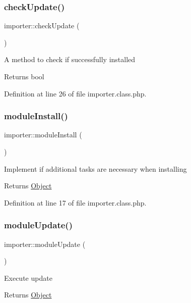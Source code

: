 \subsubsection{\texorpdfstring{check\+Update()}{checkUpdate()}}
{\footnotesize\ttfamily importer\+::check\+Update (\begin{DoxyParamCaption}{ }\end{DoxyParamCaption})}

A method to check if successfully installed \begin{DoxyReturn}{Returns}
bool 
\end{DoxyReturn}


Definition at line 26 of file importer.\+class.\+php.

\mbox{\label{classimporter_a33af57565401adc2b415a3403e7f86f0}} 
\subsubsection{\texorpdfstring{module\+Install()}{moduleInstall()}}
{\footnotesize\ttfamily importer\+::module\+Install (\begin{DoxyParamCaption}{ }\end{DoxyParamCaption})}

Implement if additional tasks are necessary when installing \begin{DoxyReturn}{Returns}
\hyperlink{classObject}{Object} 
\end{DoxyReturn}


Definition at line 17 of file importer.\+class.\+php.

\mbox{\label{classimporter_affadc5d8acbfc67adbd423350b1ccb96}} 
\subsubsection{\texorpdfstring{module\+Update()}{moduleUpdate()}}
{\footnotesize\ttfamily importer\+::module\+Update (\begin{DoxyParamCaption}{ }\end{DoxyParamCaption})}

Execute update \begin{DoxyReturn}{Returns}
\hyperlink{classObject}{Object} 
\end{DoxyReturn}


